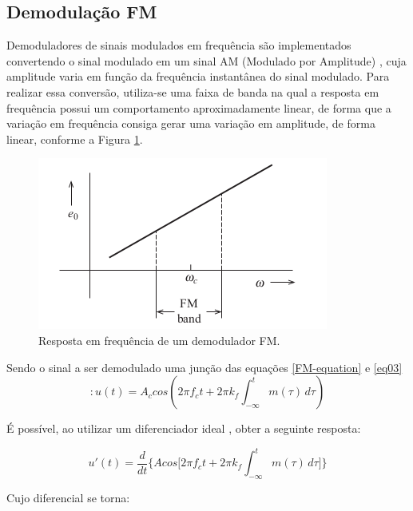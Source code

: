 \subsection{Demodulação FM}
Demoduladores de sinais modulados em frequência são implementados convertendo o sinal modulado em um sinal AM (Modulado por Amplitude) \cite{proakis}, cuja amplitude varia em função da frequência instantânea do sinal modulado. Para realizar essa conversão, utiliza-se uma faixa de banda na qual a resposta em frequência possui um comportamento aproximadamente linear, de forma que a variação em frequência consiga gerar uma variação em amplitude, de forma linear, conforme a Figura \ref{fig01}.

\begin{figure}[!htb]
	\centering
	\includegraphics[width=1\linewidth]{Imagens/fig01.png}
	\caption{Resposta em frequência de um demodulador FM.}
	\label{fig01}
\end{figure}


Sendo o sinal a ser demodulado uma junção das equações \ref{FM-equation} e \ref{eq03}
\begin{equation}: 
    u(t) = A_c cos(2 \pi f_ct + 2\pi k_f \int_{-\infty}^{t} m(\tau) \,d\tau )
    \label{eq09}
\end{equation}

É possível, ao utilizar um diferenciador ideal \cite{lathi}, obter a seguinte resposta:

\begin{equation}
    u'(t) = \frac{d}{dt} 
    \Biggl\{
    Acos
    \Bigr[
    2\pi f_ct + 2\pi k_f \int_{-\infty}^{t} m(\tau) \,d\tau
    \Bigr]
    \Biggl\}
    \label{eq10}
\end{equation}

Cujo diferencial se torna:

